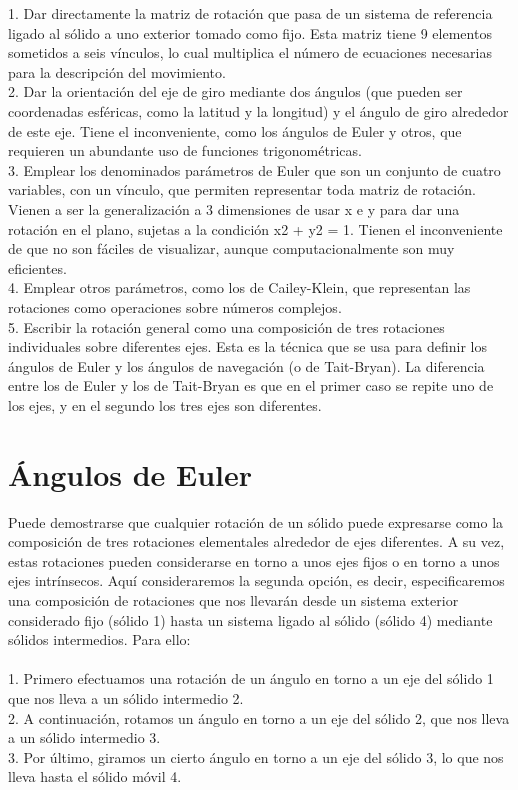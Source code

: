 \documentclass[11pt,a4paper,oldfontcommands,oneside]{memoir}
\begin{document}
1.	Dar directamente la matriz de rotación que pasa de un sistema de referencia ligado al sólido a uno exterior tomado como fijo. Esta matriz tiene 9 elementos sometidos a seis vínculos, lo cual multiplica el número de ecuaciones necesarias para la descripción del movimiento.\\

2.	Dar la orientación del eje de giro mediante dos ángulos (que pueden ser coordenadas esféricas, como la latitud y la longitud) y el ángulo de giro alrededor de este eje. Tiene el inconveniente, como los ángulos de Euler y otros, que requieren un abundante uso de funciones trigonométricas.\\

3.	Emplear los denominados parámetros de Euler que son un conjunto de cuatro variables, con un vínculo, que permiten representar toda matriz de rotación. Vienen a ser la generalización a 3 dimensiones de usar x e y para dar una rotación en el plano, sujetas a la condición x2 + y2 = 1. Tienen el inconveniente de que no son fáciles de visualizar, aunque computacionalmente son muy eficientes.\\

4.	Emplear otros parámetros, como los de Cailey-Klein, que representan las rotaciones como operaciones sobre números complejos.\\

5.	Escribir la rotación general como una composición de tres rotaciones individuales sobre diferentes ejes. Esta es la técnica que se usa para definir los ángulos de Euler y los ángulos de navegación (o de Tait-Bryan). La diferencia entre los de Euler y los de Tait-Bryan es que en el primer caso se repite uno de los ejes, y en el segundo los tres ejes son diferentes. 

\chapter{Ángulos de Euler}
Puede demostrarse que cualquier rotación de un sólido puede expresarse como la composición de tres rotaciones elementales alrededor de ejes diferentes. A su vez, estas rotaciones pueden considerarse en torno a unos ejes fijos o en torno a unos ejes intrínsecos. Aquí consideraremos la segunda opción, es decir, especificaremos una composición de rotaciones que nos llevarán desde un sistema exterior considerado fijo (sólido 1) hasta un sistema ligado al sólido (sólido 4) mediante sólidos intermedios. Para ello: \\ \\
1.	Primero efectuamos una rotación de un ángulo en torno a un eje del sólido 1 que nos lleva a un sólido intermedio 2.\\
2.	A continuación, rotamos un ángulo en torno a un eje del sólido 2, que nos lleva a un sólido intermedio 3.\\
3.	Por último, giramos un cierto ángulo en torno a un eje del sólido 3, lo que nos lleva hasta el sólido móvil 4.
\end{document}
